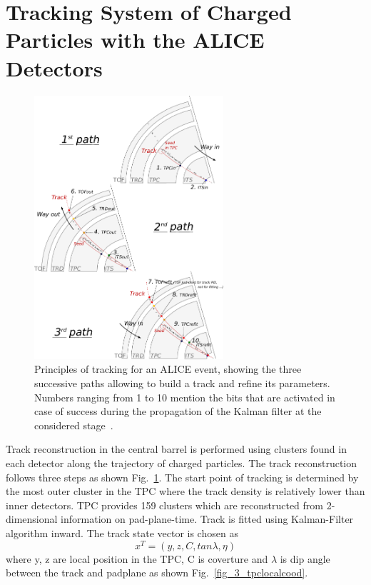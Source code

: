 \section{Tracking System of Charged Particles with the ALICE Detectors}
\label{sec_3_trackrec}
\begin{figure}[!h]
  \centering
  \includegraphics[width=7cm]{chap3/figure/TrackReconstruction/Schematics_TrackingALICE.png}
  \caption{Principles of tracking for an ALICE event, showing the three successive paths allowing to build a track and refine its parameters. Numbers ranging from 1 to 10 mention the bits that are activated in case of success during the propagation of the Kalman filter at the considered stage~\cite{bib_schematrackrec}.}
  \label{fig_3_trackrec}
\end{figure}
Track reconstruction in the central barrel is performed using clusters found in each detector along the trajectory of charged particles. 
The track reconstruction follows three steps as shown Fig.~\ref{fig_3_trackrec}. 
The start point of tracking is determined by the most outer cluster in the TPC where the track density is relatively lower than inner detectors. 
TPC provides 159 clusters which are reconstructed from 2-dimensional information on pad-plane-time. 
Track is fitted using Kalman-Filter algorithm inward. 
The track state vector is chosen as 
\begin{equation}
  x^{T} = (y, z, C, tan\lambda, \eta)
\end{equation}
where y, z are local position in the TPC, C is coverture and $\lambda$ is dip angle between the track and padplane as shown Fig.~\ref{fig_3_tpclocalcood}. 
